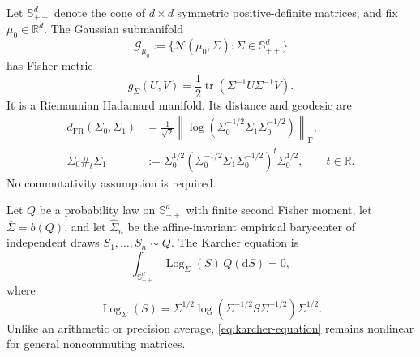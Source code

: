 \documentclass[11pt,a4paper]{article}
\theoremstyle{remark}
\newcommand{\R}{\mathbb R}
\newcommand{\Spp}[1]{\mathbb S_{++}^{#1}}
\newcommand{\tr}{\operatorname{tr}}
\newcommand{\Log}{\operatorname{Log}}
\begin{document}
Let \(\Spp{d}\) denote the cone of \(d\times d\) symmetric positive-definite matrices, and fix \(\mu_0\in\R^d\).  The Gaussian submanifold
\begin{equation}
\label{eq:fixed-mean-manifold}
 \mathcal G_{\mu_0}:=
 \{\mathcal N(\mu_0,\Sigma):\Sigma\in\Spp{d}\}
\end{equation}
has Fisher metric
\begin{equation}
\label{eq:spd-fr-metric}
 g_\Sigma(U,V)=\frac12\tr(\Sigma^{-1}U\Sigma^{-1}V).
\end{equation}
It is a Riemannian Hadamard manifold.  Its distance and geodesic are \cite{bhatia2007,moakher2005,pinele2020}
\begin{align}
\label{eq:spd-fr-distance}
 d_{\mathrm{FR}}(\Sigma_0,\Sigma_1)
 &=\frac1{\sqrt2}
 \left\|\log\!\left(\Sigma_0^{-1/2}\Sigma_1\Sigma_0^{-1/2}\right)\right\|_{\mathrm F},\\
\label{eq:spd-geodesic}
 \Sigma_0\#_t\Sigma_1
 &:=\Sigma_0^{1/2}
 \left(\Sigma_0^{-1/2}\Sigma_1\Sigma_0^{-1/2}\right)^t
 \Sigma_0^{1/2},
 \qquad t\in\R.
\end{align}
No commutativity assumption is required.

Let \(Q\) be a probability law on \(\Spp{d}\) with finite second Fisher moment, let \(\overline\Sigma=b(Q)\), and let \(\widehat\Sigma_n\) be the affine-invariant empirical barycenter of independent draws \(S_1,\ldots,S_n\sim Q\).  The Karcher equation is
\begin{equation}
\label{eq:karcher-equation}
 \int_{\Spp{d}}\Log_{\overline\Sigma}(S)\,Q(\mathrm dS)=0,
\end{equation}
where
\[
 \Log_\Sigma(S)
 =\Sigma^{1/2}\log\!\left(\Sigma^{-1/2}S\Sigma^{-1/2}\right)\Sigma^{1/2}.
\]
Unlike an arithmetic or precision average, \eqref{eq:karcher-equation} remains nonlinear for general noncommuting matrices.
\end{document}
